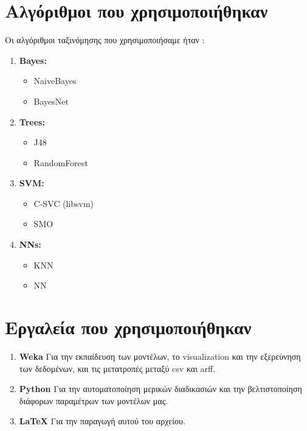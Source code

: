\section{Αλγόριθμοι που χρησιμοποιήθηκαν}
Οι αλγόριθμοι ταξινόμησης που χρησιμοποιήσαμε ήταν :
\begin{enumerate}
  \item \textbf{Bayes:}
  \begin{itemize}
     \item NaiveBayes
     \item BayesNet
  \end{itemize}  
  \item \textbf{Trees:}
  \begin{itemize}
     \item J48
     \item RandomForest
  \end{itemize}
  \item \textbf{SVM:}  
  \begin{itemize}
     \item C-SVC (libsvm)
     \item SMO
  \end{itemize}
  \item \textbf{NNs:}
  \begin{itemize}
     \item KNN
     \item NN
  \end{itemize}
\end{enumerate}

\section{Εργαλεία που χρησιμοποιήθηκαν}

\begin{enumerate}
  \item \textbf{Weka}
  Για την εκπαίδευση των μοντέλων,
  το visualization και την εξερεύνηση των δεδομένων,
  και τις μετατροπές μεταξύ csv και arff.
  \item \textbf{Python}
  Για την αυτοματοποίηση μερικών διαδικασιών
  και την βελτιστοποίηση διάφορων παραμέτρων των μοντέλων μας.
  \item \textbf{\LaTeX{}}
  Για την παραγωγή αυτού του αρχείου.
\end{enumerate}
